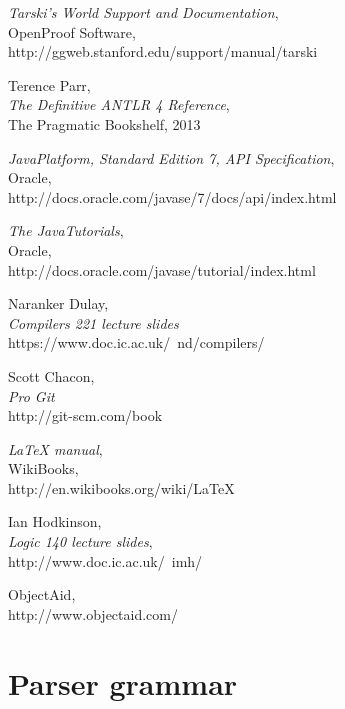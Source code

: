 \documentclass{report}
\begin{document}
\begin{thebibliography}{9}
  \emph{Tarski's World Support and Documentation}, \\
  OpenProof Software, \\
  http://ggweb.stanford.edu/support/manual/tarski

  Terence Parr, \\
  \emph{The Definitive ANTLR 4 Reference}, \\
  The Pragmatic Bookshelf, 2013

  \emph{Java\textregistered Platform, Standard Edition 7, API Specification},\\
  Oracle, \\
  http://docs.oracle.com/javase/7/docs/api/index.html 

  \emph{The Java\textregistered Tutorials}, \\
  Oracle, \\
  http://docs.oracle.com/javase/tutorial/index.html

  Naranker Dulay, \\
  \emph{Compilers 221 lecture slides} \\
  https://www.doc.ic.ac.uk/~nd/compilers/

  Scott Chacon, \\
  \emph{Pro Git} \\
  http://git-scm.com/book

  \emph{LaTeX manual}, \\
  WikiBooks, \\
  http://en.wikibooks.org/wiki/LaTeX

  Ian Hodkinson, \\
  \emph{Logic 140 lecture slides}, \\
  http://www.doc.ic.ac.uk/~imh/

  ObjectAid, \\
  http://www.objectaid.com/

\end{thebibliography}


\appendix
\chapter{Parser grammar}

\end{document}
